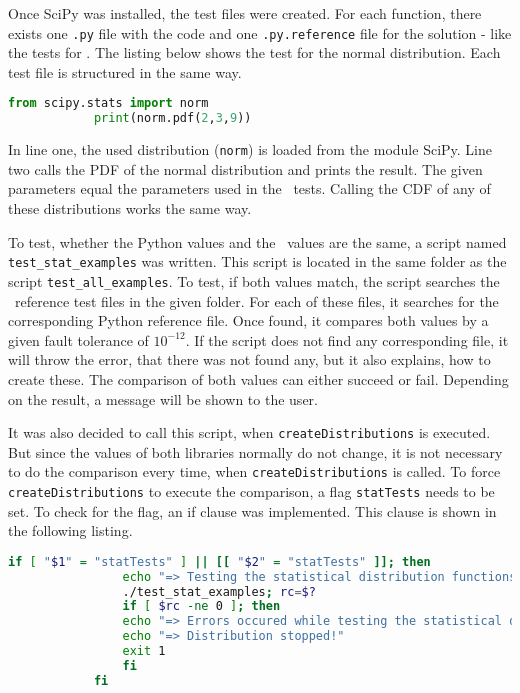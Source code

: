 	Once \ac{SciPy} was installed, the test files were created. For each function, there exists one \lstinline{.py} file with the code and one \lstinline{.py.reference} file for the solution - like the tests for \setlx. The listing below shows the test for the normal distribution. Each test file is structured in the same way.

	\begin{center}
		\begin{lstlisting}[caption={Python Test Example}, language={Python}, label={lis:pythontest}]
			from scipy.stats import norm
			print(norm.pdf(2,3,9))
		\end{lstlisting}
	\end{center}

	In line one, the used distribution (\lstinline{norm}) is loaded from the module \ac{SciPy}. Line two calls the \ac{PDF} of the normal distribution and prints the result. The given parameters equal the parameters used in the \setlx\ tests. Calling the \ac{CDF} of any of these distributions works the same way.

	To test, whether the Python values and the \setlx\ values are the same, a script named \lstinline{test_stat_examples} was written. This script is located in the same folder as the script \lstinline{test_all_examples}. To test, if both values match, the script searches the \setlx\ reference test files in the given folder. For each of these files, it searches for the corresponding Python reference file. Once found, it compares both values by a given fault tolerance of $10^{-12}$. If the script does not find any corresponding file, it will throw the error, that there was not found any, but it also explains, how to create these. The comparison of both values can either succeed or fail. Depending on the result, a message will be shown to the user.

	It was also decided to call this script, when \lstinline{createDistributions} is executed. But since the values of both libraries normally do not change, it is not necessary to do the comparison every time, when \lstinline{createDistributions} is called. To force \lstinline{createDistributions} to execute the comparison, a flag \lstinline{statTests} needs to be set. To check for the flag, an if clause was implemented. This clause is shown in the following listing.

	\begin{center}
		\begin{lstlisting}[caption={Check for statTests flag}, language={bash}, label={lis:stattestsflag}]
			if [ "$1" = "statTests" ] || [[ "$2" = "statTests" ]]; then
			    echo "=> Testing the statistical distribution functions ..."
			    ./test_stat_examples; rc=$?
			    if [ $rc -ne 0 ]; then
				echo "=> Errors occured while testing the statistical distribution functions."
				echo "=> Distribution stopped!"
				exit 1
			    fi
			fi
		\end{lstlisting}
	\end{center}
